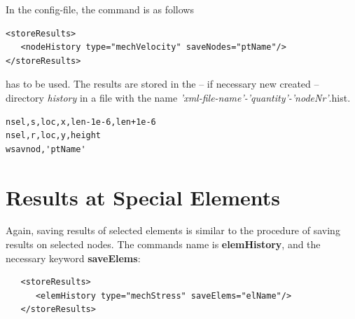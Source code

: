 In the config-file, the command is as follows

\begin{verbatim}
<storeResults>
   <nodeHistory type="mechVelocity" saveNodes="ptName"/>
</storeResults>
\end{verbatim}

has to be used. The results are stored in the -- if necessary new
created -- directory {\em history} in a file with the name {\em
  'xml-file-name'-'quantity'-'nodeNr'}.hist.

\begin{verbatim}
nsel,s,loc,x,len-1e-6,len+1e-6
nsel,r,loc,y,height
wsavnod,'ptName'
\end{verbatim}


\section{Results at Special Elements} 
Again, saving results of selected elements is similar to the procedure
of saving results on selected nodes. The commands name is {\bf
  elemHistory}, and the necessary keyword {\bf saveElems}:
\begin{verbatim}
   <storeResults>
      <elemHistory type="mechStress" saveElems="elName"/>
   </storeResults>
\end{verbatim}

